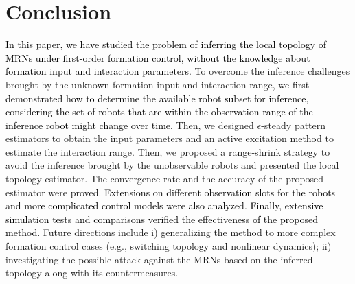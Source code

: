 \documentclass[12pt,journal,draftclsnofoot,onecolumn]{IEEEtran}
\begin{document}
\section{Conclusion}\label{conclusion}
\textcolor{black}{In this paper, we have studied the problem of inferring the local topology of MRNs under first-order formation control, without the knowledge about formation input and interaction parameters}. 
To overcome the inference challenges brought by the unknown formation input and interaction range, 
\textcolor{black}{we first demonstrated how to determine the available robot subset for inference, considering the set of robots that are within the observation range of the inference robot might change over time. }
Then, we designed $\epsilon$-steady pattern estimators to obtain the input parameters and an active excitation method to estimate the interaction range. 
Then, we proposed a range-shrink strategy to avoid the inference brought by the unobservable robots and presented the local topology estimator. 
The convergence rate and the accuracy of the proposed estimator were proved. 
\textcolor{black}{Extensions on different observation slots for the robots and more complicated control models were also analyzed. 
Finally, extensive simulation tests and comparisons verified the effectiveness of the proposed method.} 
Future directions include i) generalizing the method to more complex formation control cases (e.g., switching topology and nonlinear dynamics); 
ii) investigating the possible attack against the MRNs based on the inferred topology along with its countermeasures. 




\appendix 
\end{document}
